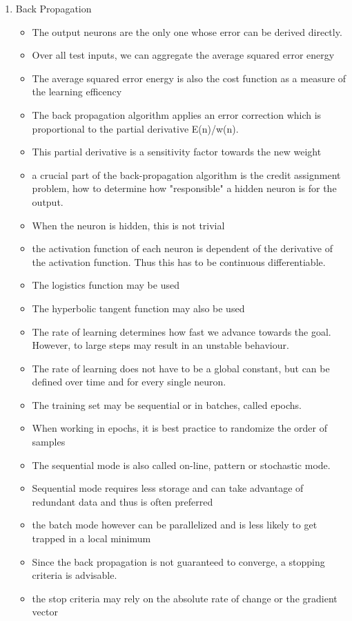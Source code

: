 \documentclass{scrartcl}
\begin{document}
\begin{enumerate}
\item Back Propagation
	\begin{itemize}
	\item The output neurons are the only one whose error can be derived directly.
	\item Over all test inputs, we can aggregate the average squared error energy
	\item The average squared error energy is also the cost function as a measure of the learning efficency
	\item The back propagation algorithm applies an error correction which is proportional to the partial derivative E(n)/w(n).
	\item This partial derivative is a sensitivity  factor towards the new weight
	\item a crucial part of the back-propagation algorithm is the credit assignment problem, how to determine how "responsible" a hidden neuron is for the output.
	\item When the neuron is hidden, this is not trivial 
	\item the activation function of each neuron is dependent of the derivative of the activation function. Thus this has to be continuous differentiable.
	\item The logistics function may be used
	\item The hyperbolic tangent function may also be used
	\item The rate of learning determines how fast we advance towards the goal. However, to large steps may result in an unstable behaviour.
	\item The rate of learning does not have to be a global constant, but can be defined over time and for every single neuron.
	\item The training set may be sequential or in batches, called epochs.
	\item When working in epochs, it is best practice to randomize the order of samples
	\item The sequential mode is also called on-line, pattern or stochastic mode.
	\item Sequential mode requires less storage and can take advantage of redundant data and thus is often preferred
	\item the batch mode however can be parallelized and is less likely to get trapped in a local minimum
	\item Since the back propagation is not guaranteed to converge, a stopping criteria is advisable.
	\item the stop criteria may rely on the absolute rate of change or the gradient vector
	\end{itemize}
	

\end{enumerate}
\end{document}
